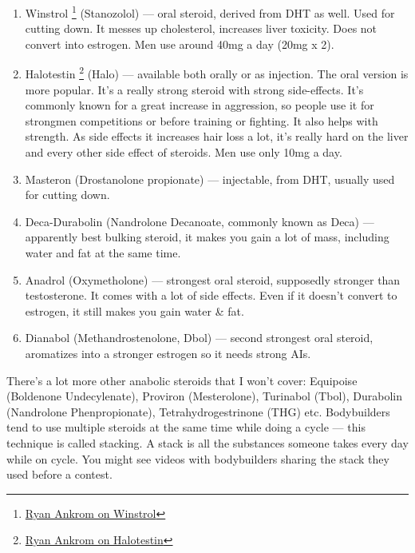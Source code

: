\documentclass[openany, 12pt]{book}
\begin{document}
\begin{enumerate}
		\item Winstrol
                  \footnote{\href{https://www.youtube.com/watch?v=wH0A95aktLo}{Ryan Ankrom on Winstrol}}
                  (Stanozolol) --- oral steroid, derived from DHT as well. Used for cutting down. It messes up cholesterol, increases liver toxicity. Does not convert into estrogen.
                  Men use around 40mg a day (20mg x 2).

		\item Halotestin
                  \footnote{\href{https://www.youtube.com/watch?v=W8Gghg6vvuU}{Ryan Ankrom on Halotestin}}
                  (Halo) --- available both orally or as injection. The oral version is more popular. It's a really strong steroid with strong side-effects. It's commonly known for a great increase in
                  aggression, so people use it for strongmen competitions or before training or fighting. It also helps with strength. As side effects it increases hair loss a lot, it's really hard on the liver
                  and every other side effect of steroids. Men use only 10mg a day.

		\item Masteron (Drostanolone propionate) --- injectable, from DHT, usually used for cutting down.

		\item Deca-Durabolin (Nandrolone Decanoate, commonly known as Deca) --- apparently best bulking steroid, it makes you gain a lot of mass, including water and fat at the same time.

		\item Anadrol (Oxymetholone) --- strongest oral steroid, supposedly stronger than testosterone. It comes with a lot of side effects. Even if it doesn't convert to estrogen, it still
                  makes you gain water \& fat.
                  
		\item Dianabol (Methandrostenolone, Dbol) --- second strongest oral steroid, aromatizes into a stronger estrogen so it needs strong AIs.

	\end{enumerate}

        There's a lot more other anabolic steroids that I won't cover: Equipoise (Boldenone Undecylenate), Proviron (Mesterolone), Turinabol (Tbol), Durabolin (Nandrolone Phenpropionate),
        Tetrahydrogestrinone (THG) etc. Bodybuilders tend to use multiple steroids at the same time while doing a cycle --- this technique is called stacking.
        A stack is all the substances someone takes every day while on cycle. You might see videos with bodybuilders sharing the stack they used before a contest.
\end{document}
